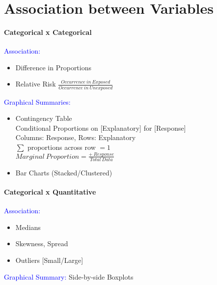 \section{Association between Variables}
\paragraph{Categorical x Categorical}
\textcolor{Blue}{Association:}\\
\begin{itemize}
	\item Difference in Proportions
	\item Relative Risk $\frac{Occurrence\ in\ Exposed}{Occurrence\ in\ Unexposed}$
\end{itemize}
\textcolor{Blue}{Graphical Summaries:}
\begin{itemize}
	\item Contingency Table\\
		Conditional Proportions on [Explanatory] for [Response]\\
	 	Columns: Response, Rows: Explanatory\\
		$\sum$ proportions across row $=1$\\
		$Marginal\ Proportion=\frac{+\ Response}{Total\ Data}$
	\item Bar Charts (Stacked/Clustered)
\end{itemize}
\paragraph{Categorical x Quantitative}
\textcolor{Blue}{Association:}
\begin{itemize}
	\item Medians
	\item Skewness, Spread
	\item Outliers [Small/Large]
\end{itemize}
\textcolor{Blue}{Graphical Summary:} Side-by-side Boxplots
